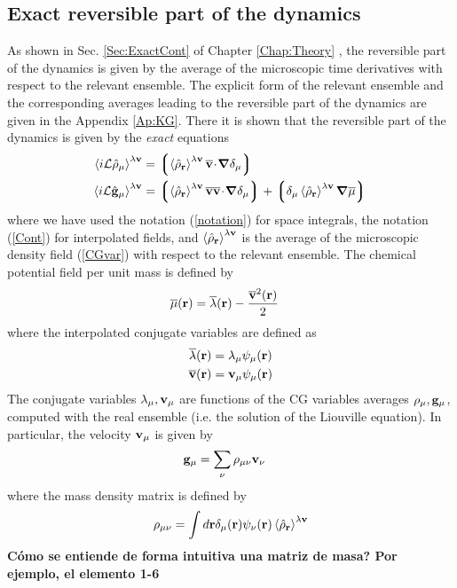 \documentclass[b5paper,openright,11pt]{book}
\newcommand{\esc}{\!\cdot\!}
\newcommand{\Note}[1]{{\bf \color{red}#1}}    %
\newcommand{\llangle}{\left\langle}
\newcommand{\rrangle}{\right\rangle}
\newcommand{\llg}{\left\lgroup}
\newcommand{\rlg}{\right\rgroup}
\begin{document}
\subsection{Exact reversible part of the dynamics}
As shown in Sec. \ref{Sec:ExactCont} of Chapter \ref{Chap:Theory} , the reversible part
of  the dynamics  is  given by  the average  of  the microscopic  time
derivatives with respect to the  relevant ensemble.  The explicit form
of the relevant ensemble and the corresponding averages leading to the
reversible  part   of  the   dynamics  are   given  in   the  Appendix
\ref{Ap:KG}.  There  it is  shown  that  the  reversible part  of  the
dynamics is given by the \textit{exact} equations
\begin{align}
  \llangle i{\cal L}\hat{\rho}_\mu\rrangle^{\lambda{\bf v}} &=
  \llg\llangle \hat{\rho}_{\bf r}\rrangle^{\lambda{\bf v}}
\overline{\bf v}\esc\boldsymbol{\nabla}\delta_{\mu}\rlg
\nonumber\\
  \llangle i{\cal L}\hat{\bf g}_\mu\rrangle^{\lambda{\bf v}} &=
\llg\llangle \hat{\rho}_{\bf r}\rrangle^{\lambda{\bf v}}
\overline{\bf v}\overline{\bf v}\esc\boldsymbol{\nabla}\delta_{\mu}\rlg
+\llg\delta_\mu\llangle\hat{\rho}_{\bf r}\rrangle^{\lambda{\bf v}}\boldsymbol{\nabla}\overline{\mu}\rlg
\label{ExactRev}
\end{align}
where we have used the  notation (\ref{notation}) for space integrals,
the  notation  (\ref{Cont})  for interpolated  fields,  and  $\llangle
\hat{\rho}_{\bf  r}\rrangle^{\lambda{\bf v}}$  is the  average of  the
microscopic  density field  (\ref{CGvar})  with  respect to  the
relevant  ensemble.  The  chemical potential  field per  unit mass  is
defined by
\begin{align}
  \overline{\mu}({\bf r})&=\overline{\lambda}({\bf r})-\frac{\overline{\bf v}^2({\bf r})}{2}
\end{align}
where the interpolated conjugate variables are defined as
\begin{align}
  \overline{\lambda}({\bf r})&={\lambda}_{\mu}\psi_\mu({\bf r})
\nonumber\\
  \overline{\bf v}({\bf r})&={\bf v}_{\mu}\psi_\mu({\bf r})
\end{align}
The conjugate variables $\lambda_\mu,{\bf v}_\mu$ are functions of the
CG variables averages $\rho_\mu,{\bf g}_\mu$, computed with the real ensemble (i.e. the solution of the Liouville equation). In particular, the velocity ${\bf
  v}_\mu$ is given by
\begin{align}
  {\bf g}_\mu&=\sum_{\nu}\rho_{\mu\nu}{\bf v}_\nu
\label{nu}
\end{align}
where  the mass density matrix is defined by
\begin{align}
  \rho_{\mu\nu} =\int d{\bf r}
\delta_\mu({\bf r})\psi_\nu({\bf r})\llangle\hat{\rho}_{\bf r}\rrangle^{\lambda{\bf v}}
\label{rhomunu}
\end{align}
\Note{Cómo se entiende de forma intuitiva una matriz de masa? Por ejemplo, el elemento 1-6}
\end{document}
